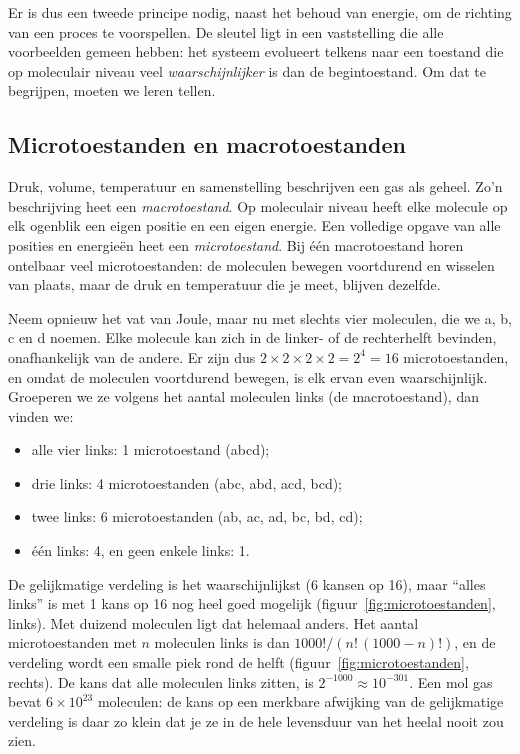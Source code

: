 Er is dus een tweede principe nodig, naast het behoud van energie, om de richting van een proces te voorspellen. De sleutel ligt in een vaststelling die alle voorbeelden gemeen hebben: het systeem evolueert telkens naar een toestand die op moleculair niveau veel \emph{waarschijnlijker} is dan de begintoestand. Om dat te begrijpen, moeten we leren tellen.

\subsection{Microtoestanden en macrotoestanden}
\label{sec:waarschijnlijkheid-entropie}

Druk, volume, temperatuur en samenstelling beschrijven een gas als geheel. Zo'n beschrijving heet een \emph{macrotoestand}. Op moleculair niveau heeft elke molecule op elk ogenblik een eigen positie en een eigen energie. Een volledige opgave van alle posities en energie\"en heet een \emph{microtoestand}. Bij \'e\'en macrotoestand horen ontelbaar veel microtoestanden: de moleculen bewegen voortdurend en wisselen van plaats, maar de druk en temperatuur die je meet, blijven dezelfde.

Neem opnieuw het vat van Joule, maar nu met slechts vier moleculen, die we a, b, c en d noemen. Elke molecule kan zich in de linker- of de rechterhelft bevinden, onafhankelijk van de andere. Er zijn dus $2 \times 2 \times 2 \times 2 = 2^4 = 16$ microtoestanden, en omdat de moleculen voortdurend bewegen, is elk ervan even waarschijnlijk. Groeperen we ze volgens het aantal moleculen links (de macrotoestand), dan vinden we:
\begin{itemize}
\item alle vier links: 1 microtoestand (abcd);
\item drie links: 4 microtoestanden (abc, abd, acd, bcd);
\item twee links: 6 microtoestanden (ab, ac, ad, bc, bd, cd);
\item \'e\'en links: 4, en geen enkele links: 1.
\end{itemize}
De gelijkmatige verdeling is het waarschijnlijkst (6 kansen op 16), maar ``alles links'' is met 1 kans op 16 nog heel goed mogelijk (figuur~\ref{fig:microtoestanden}, links). Met duizend moleculen ligt dat helemaal anders. Het aantal microtoestanden met $n$ moleculen links is dan $1000!/(n!\,(1000-n)!)$, en de verdeling wordt een smalle piek rond de helft (figuur~\ref{fig:microtoestanden}, rechts). De kans dat alle moleculen links zitten, is $2^{-1000} \approx 10^{-301}$. Een mol gas bevat $6\times10^{23}$ moleculen: de kans op een merkbare afwijking van de gelijkmatige verdeling is daar zo klein dat je ze in de hele levensduur van het heelal nooit zou zien.

